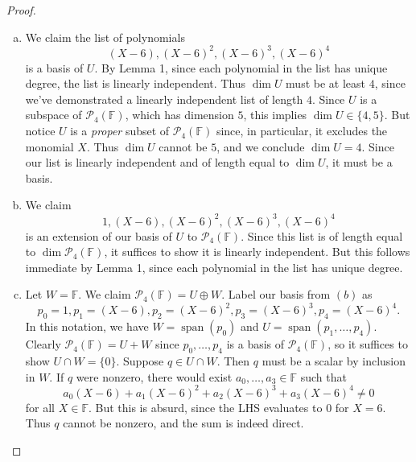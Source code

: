 \documentclass{extarticle}
\newcommand{\F}{\mathbb{F}}
\DeclareMathOperator{\Span}{span}
\begin{document}
\begin{proof}
\begin{enumerate}[(a)]
\item We claim the list of polynomials
\begin{equation*}
(X - 6), (X - 6)^2, (X - 6)^3, (X-6)^4
\end{equation*}
is a basis of $U$.  By Lemma 1, since each polynomial in the list has unique degree, the list is linearly independent.  Thus $\dim U$ must be at least $4$, since we've demonstrated a linearly independent list of length $4$.  Since $U$ is a subspace of $\mathcal{P}_4(\F)$, which has dimension $5$, this implies $\dim U\in\{4,5\}$.  But notice $U$ is a \emph{proper} subset of $\mathcal{P}_4(\F)$ since, in particular, it excludes the monomial $X$.  Thus $\dim U$ cannot be $5$, and we conclude $\dim U = 4$.  Since our list is linearly independent and of length equal to $\dim U$, it must be a basis.
\item We claim 
\begin{equation*}
1, (X - 6), (X - 6)^2, (X - 6)^3, (X-6)^4
\end{equation*}
is an extension of our basis of $U$ to $\mathcal{P}_4(\F)$.  Since this list is of length equal to $\dim\mathcal{P}_4(\F)$, it suffices to show it is linearly independent.  But this follows immediate by Lemma 1, since each polynomial in the list has unique degree.
\item Let $W = \F$.  We claim $\mathcal{P}_4(\F)=U\oplus W$.  Label our basis from $(b)$ as
\begin{equation*}
p_0=1, p_1=(X - 6), p_2=(X - 6)^2, p_3=(X - 6)^3, p_4=(X-6)^4.
\end{equation*}
In this notation, we have $W = \Span(p_0)$ and $U=\Span(p_1,\dots,p_4)$.  Clearly $\mathcal{P}_4(\F)=U+W$ since $p_0,\dots,p_4$ is a basis of $\mathcal{P}_4(\F)$, so it suffices to show $U\cap W = \{0\}$.  Suppose $q\in U\cap W$.  Then $q$ must be a scalar by inclusion in $W$.  If $q$ were nonzero, there would exist $a_0,\dots,a_3\in \F$ such that
\begin{equation*}
a_0(X-6) + a_1(X-6)^2 + a_2(X-6)^3 + a_3(X-6)^4 \neq 0
\end{equation*}
for all $X\in\F$.  But this is absurd, since the LHS evaluates to $0$ for $X=6$.  Thus $q$ cannot be nonzero, and the sum is indeed direct. \qedhere
\end{enumerate}
\end{proof}
\end{document}
